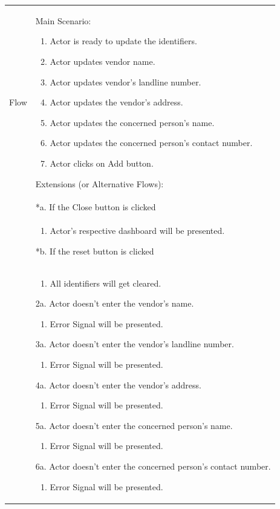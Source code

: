 \documentclass[12pt,a4paper]{report}
\begin{document}
\begin{tabular}{ | m{3cm} | m{12cm}| } \hline

Flow & Main Scenario:

\begin{enumerate}

\item Actor is ready to update the identifiers.
\item Actor updates vendor name.
\item Actor updates vendor's landline number.
\item Actor updates the vendor's address.
\item Actor updates the concerned person's name.
\item Actor updates the concerned person's contact number.
\item Actor clicks on Add button.
\end{enumerate}

Extensions (or Alternative Flows):\\
& *a. If the Close button is clicked \\
& \begin{enumerate}
		\item Actor's respective dashboard will be presented.
	\end{enumerate}
*b. If the reset button is clicked \\
&	\begin{enumerate}
		\item All identifiers will get cleared.
	\end{enumerate}
2a. Actor doesn't enter the vendor's name.
 	\begin{enumerate}
		\item Error Signal will be presented.
	\end{enumerate}
3a. Actor doesn't enter the vendor's landline number.
 	\begin{enumerate}
		\item Error Signal will be presented.
	\end{enumerate}
4a. Actor doesn't enter the vendor's address.
 	\begin{enumerate}
		\item Error Signal will be presented.
	\end{enumerate}
5a. Actor doesn't enter the concerned person's name.
 	\begin{enumerate}
		\item Error Signal will be presented.
	\end{enumerate}
6a. Actor doesn't enter the concerned person's contact number.
 	\begin{enumerate}
		\item Error Signal will be presented.
	\end{enumerate}
\\ \hline
\end{tabular}
\end{document}
